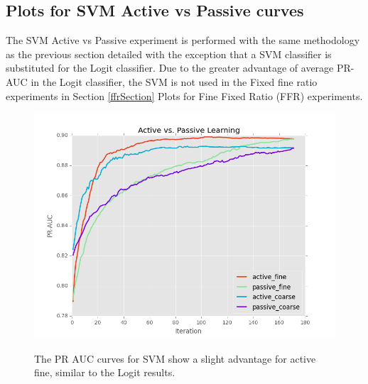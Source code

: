 \documentclass[ms]{nuthesis}
\begin{document}
\clearpage

\subsection{Plots for SVM Active vs Passive curves}
\par The SVM Active vs Passive experiment is performed with the same methodology
as the previous section detailed with the exception that a SVM classifier is
substituted for the Logit classifier. Due to the greater advantage of average
PR-AUC in the Logit classifier, the SVM is not used in the Fixed fine ratio
experiments in Section \ref{ffrSection} Plots for Fine Fixed Ratio (FFR) experiments.

\FloatBarrier
\begin{figure}[!htb]
	\centering
    \includegraphics[width=1.0\columnwidth]{fig/runActPassSVM_pr}
    \label{fig:ActiveVsPassivePRSVM}
    \caption{The PR AUC curves for SVM show a slight advantage for active fine,
     similar to the Logit results.}
\end{figure}
\FloatBarrier
\end{document}
